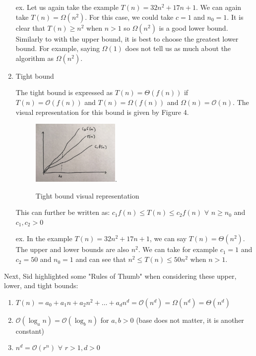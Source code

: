 \begin{enumerate}
    ex. Let us again take the example $T(n)=32n^2+17n+1$. We can again take $T(n) = \Omega(n^2)$. For this case, we could take $c=1$ and $n_0 = 1$. It is clear that $T(n) \geq n^2$ when $n>1$ so $\Omega(n^2)$ is a good lower bound. Similarly to with the upper bound, it is best to choose the greatest lower bound. For example, saying $\Omega(1)$ does not tell us as much about the algorithm as $\Omega(n^2)$.
    
    \item Tight bound
    
    The tight bound is expressed as $T(n) = \Theta(f(n))$ if $T(n) = \mathcal{O}(f(n))$ and $T(n) = \Omega(f(n))$ and $\Omega(n) = \mathcal{O}(n)$. The visual representation for this bound is given by Figure 4.
    
     \begin{figure}[!]
        \begin{center}
            \includegraphics[width=0.4\textwidth]{figures/IMG_8826.jpg}.
            \caption{
            Tight bound visual representation}
        \label{fig:example_figure}
    \end{center}
    \end{figure}
    
    This can further be written as:
    $c_1f(n) \leq T(n) \leq c_2f(n)$ $\forall$ $n \geq n_0$ and $c_1, c_2 > 0$
    
    ex. In the example $T(n)=32n^2+17n+1$, we can say $T(n) = \Theta(n^2)$. The upper and lower bounds are also $n^2$. We can take for example $c_1 = 1$ and $c_2 = 50$ and $n_0 = 1$ and can see that $n^2 \leq T(n) \leq 50n^2$ when $n>1$.
\end{enumerate}

Next, Sid highlighted some "Rules of Thumb" when considering these upper, lower, and tight bounds:

\begin{enumerate}
    \item $T(n)=a_0 + a_1n + a_2 n^2 + \ldots + a_dn^d = \mathcal{O}(n^d) = \Omega(n^d) = \Theta(n^d)$
    \item $\mathcal{O}(\log_a n) = \mathcal{O}(\log_b n)$ for $a, b >0$ (base does not matter, it is another constant)
    \item $n^d = \mathcal{O}(r^n)$ $\forall$ $r>1, d>0$
\end{enumerate}

